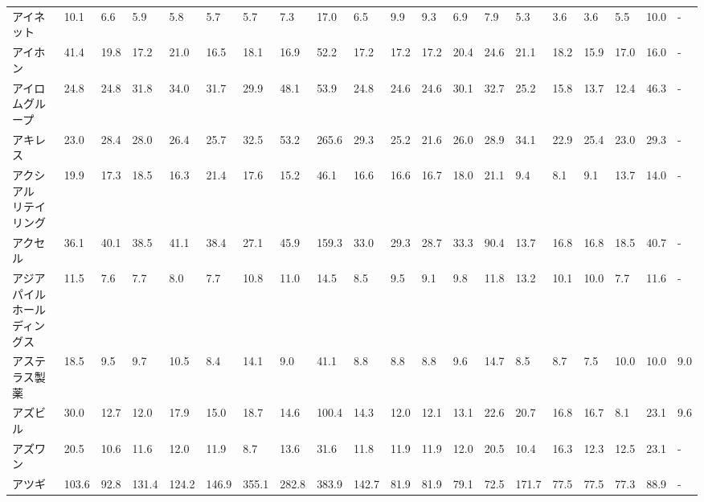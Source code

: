 \begin{longtable}[c]{lp{3mm}p{3mm}p{3mm}p{3mm}p{3mm}p{3mm}p{3mm}p{3mm}p{3mm}p{3mm}p{3mm}p{3mm}p{3mm}p{3mm}p{3mm}p{3mm}p{3mm}p{3mm}p{3mm}}
アイネット           &   10.1 &    6.6 &       5.9 &       5.8 &        5.7 &     5.7 &     7.3 &     17.0 &     6.5 &     9.9 &    9.3 &    6.9 &     7.9 &     5.3 &     3.6 &    3.6 &    5.5 &    10.0 &      - \\
アイホン            &   41.4 &   19.8 &      17.2 &      21.0 &       16.5 &    18.1 &    16.9 &     52.2 &    17.2 &    17.2 &   17.2 &   20.4 &    24.6 &    21.1 &    18.2 &   15.9 &   17.0 &    16.0 &      - \\
アイロムグループ        &   24.8 &   24.8 &      31.8 &      34.0 &       31.7 &    29.9 &    48.1 &     53.9 &    24.8 &    24.6 &   24.6 &   30.1 &    32.7 &    25.2 &    15.8 &   13.7 &   12.4 &    46.3 &      - \\
アキレス            &   23.0 &   28.4 &      28.0 &      26.4 &       25.7 &    32.5 &    53.2 &    265.6 &    29.3 &    25.2 &   21.6 &   26.0 &    28.9 &    34.1 &    22.9 &   25.4 &   23.0 &    29.3 &      - \\
アクシアル　リテイリング    &   19.9 &   17.3 &      18.5 &      16.3 &       21.4 &    17.6 &    15.2 &     46.1 &    16.6 &    16.6 &   16.7 &   18.0 &    21.1 &     9.4 &     8.1 &    9.1 &   13.7 &    14.0 &      - \\
アクセル            &   36.1 &   40.1 &      38.5 &      41.1 &       38.4 &    27.1 &    45.9 &    159.3 &    33.0 &    29.3 &   28.7 &   33.3 &    90.4 &    13.7 &    16.8 &   16.8 &   18.5 &    40.7 &      - \\
アジアパイルホールディングス  &   11.5 &    7.6 &       7.7 &       8.0 &        7.7 &    10.8 &    11.0 &     14.5 &     8.5 &     9.5 &    9.1 &    9.8 &    11.8 &    13.2 &    10.1 &   10.0 &    7.7 &    11.6 &      - \\
アステラス製薬         &   18.5 &    9.5 &       9.7 &      10.5 &        8.4 &    14.1 &     9.0 &     41.1 &     8.8 &     8.8 &    8.8 &    9.6 &    14.7 &     8.5 &     8.7 &    7.5 &   10.0 &    10.0 &    9.0 \\
アズビル            &   30.0 &   12.7 &      12.0 &      17.9 &       15.0 &    18.7 &    14.6 &    100.4 &    14.3 &    12.0 &   12.1 &   13.1 &    22.6 &    20.7 &    16.8 &   16.7 &    8.1 &    23.1 &    9.6 \\
アズワン            &   20.5 &   10.6 &      11.6 &      12.0 &       11.9 &     8.7 &    13.6 &     31.6 &    11.8 &    11.9 &   11.9 &   12.0 &    20.5 &    10.4 &    16.3 &   12.3 &   12.5 &    23.1 &      - \\
アツギ             &  103.6 &   92.8 &     131.4 &     124.2 &      146.9 &   355.1 &   282.8 &    383.9 &   142.7 &    81.9 &   81.9 &   79.1 &    72.5 &   171.7 &    77.5 &   77.5 &   77.3 &    88.9 &      - \\

\end{longtable}

